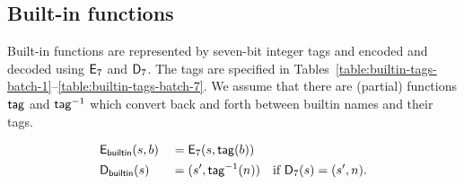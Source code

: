 \subsection{Built-in functions}
Built-in functions are represented by seven-bit integer tags and encoded and
decoded using $\mathsf{E}_7$ and $\mathsf{D}_7$.  The tags are specified in
Tables~\ref{table:builtin-tags-batch-1}--\ref{table:builtin-tags-batch-7}.  We
assume that there are (partial) functions $\mathsf{tag}$ and $\mathsf{tag}^{-1}$ which convert back
and forth between builtin names and their tags.

\begin{alignat*}{2}
  & \mathsf{E}_{\mathsf{builtin}}(s,b) &&= \mathsf{E}_7(s, \mathsf{tag}(b))\\
  & \mathsf{D}_{\mathsf{builtin}}(s)   &&= (s', \mathsf{tag}^{-1}(n)) \quad \text{if $\mathsf{D}_7(s) = (s', n)$}.\\
\end{alignat*}

